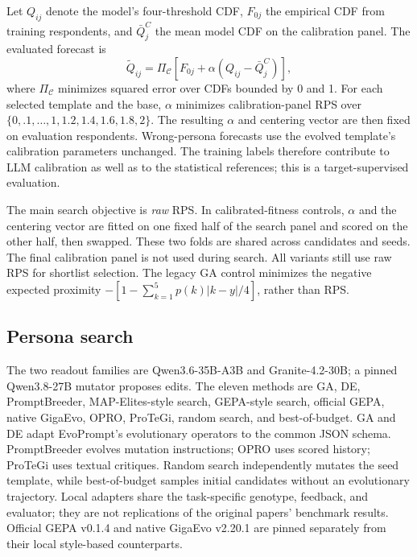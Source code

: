 \documentclass[10pt,twocolumn]{article}
\begin{document}
Let $Q_{ij}$ denote the model's four-threshold CDF, $F_{0j}$ the empirical
CDF from training respondents, and $\bar Q_j^{C}$ the mean model CDF on the
calibration panel. The evaluated forecast is
\begin{equation}
 \widetilde Q_{ij}=\Pi_{\mathcal C}
 \left[F_{0j}+\alpha\left(Q_{ij}-\bar Q_j^{C}\right)\right],
 \label{eq:calibration}
\end{equation}
where $\Pi_{\mathcal C}$ minimizes squared error over CDFs bounded by 0 and 1.
For each selected template and the base, $\alpha$ minimizes calibration-panel
RPS over $\{0,.1,\ldots,1,1.2,1.4,1.6,1.8,2\}$. The resulting $\alpha$ and
centering vector are then fixed on evaluation respondents. Wrong-persona
forecasts use the evolved template's calibration parameters unchanged.
The training labels therefore contribute to LLM calibration as well as to
the statistical references; this is a target-supervised evaluation.

The main search objective is \emph{raw} RPS. In calibrated-fitness controls,
$\alpha$ and the centering vector are fitted on one fixed half of the search
panel and scored on the other half, then swapped. These two folds are shared
across candidates and seeds. The final calibration panel is not used during
search. All variants still use raw RPS for shortlist selection. The legacy
GA control minimizes the negative expected proximity
$-\left[1-\sum_{k=1}^{5}p(k)|k-y|/4\right]$, rather than RPS.

\subsection{Persona search}\label{sec:search}
The two readout families are Qwen3.6-35B-A3B and Granite-4.2-30B; a pinned
Qwen3.8-27B mutator proposes edits. The eleven methods are GA, DE,
PromptBreeder, MAP-Elites-style search, GEPA-style search, official GEPA,
native GigaEvo, OPRO, ProTeGi, random search, and best-of-budget.
GA and DE adapt EvoPrompt's evolutionary operators to the common JSON
schema. PromptBreeder evolves mutation instructions; OPRO uses scored
history; ProTeGi uses textual critiques. Random search independently mutates
the seed template, while best-of-budget samples initial candidates without
an evolutionary trajectory. Local adapters share the task-specific genotype,
feedback, and evaluator; they are not replications of the original papers'
benchmark results. Official GEPA v0.1.4 and native GigaEvo v2.20.1 are
pinned separately from their local style-based counterparts.
\end{document}

